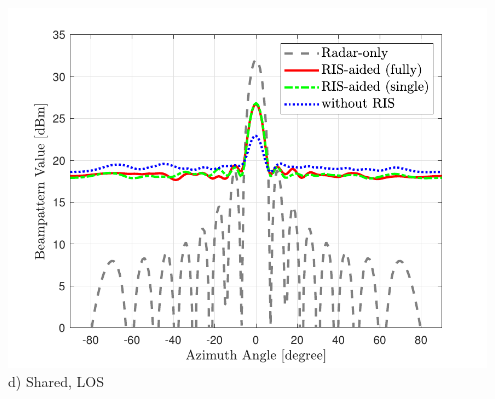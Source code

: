 \documentclass[paperwidth=841mm,paperheight=1300mm,portrait]{baposter}
\begin{document}
\begin{poster}
{\begin{minipage}[c]{0.37\textwidth}
        \begin{minipage}[c]{\textwidth}
            \centering
            \includegraphics[width=0.95\textwidth]{fig/beampattern_los_single_fully_d}\vspace{2pt}\\
            \small{d) Shared, LOS}
        \end{minipage}  
    \end{minipage}


}



\end{poster}
\end{document}
